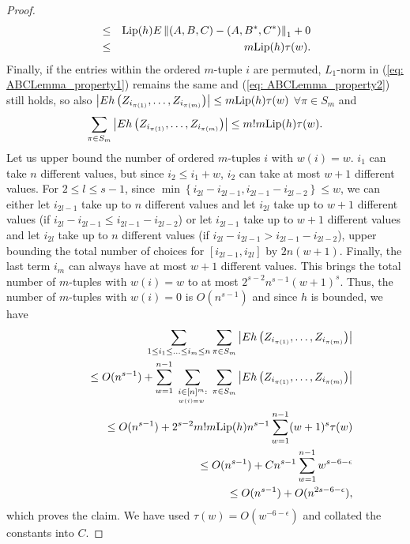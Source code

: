 \begin{proof}
\begin{eqnarray*}
 & \leq & \text{Lip}(h)E \left\Vert \left(A,B,C\right)-\left(A,B^{*},C^{*}\right)\right\Vert _{1}+0\\
 & \leq & m\text{Lip}(h)\tau(w).
\end{eqnarray*}
Finally, if the entries within the ordered $m$-tuple $i$ are permuted,
$L_{1}$-norm in (\ref{eq: ABCLemma_property1}) remains the same
and (\ref{eq: ABCLemma_property2}) still holds, so also $\left|E h\left(Z_{i_{\pi(1)}},\ldots,Z_{i_{\pi(m)}}\right)\right|\leq m\text{Lip}(h)\tau(w)$
$\forall\pi\in S_{m}$ and 
\[
\sum_{\pi\in S_{m}}\left|E h\left(Z_{i_{\pi(1)}},\ldots,Z_{i_{\pi(m)}}\right)\right|\leq m!m\text{Lip}(h)\tau(w).
\]
Let us upper bound the number of ordered $m$-tuples $i$ with $w(i)=w$.
$i_{1}$ can take $n$ different values, but since $i_{2}\leq i_{1}+w$,
$i_{2}$ can take at most $w+1$ different values. For $2\leq l\leq s-1$,
since $\min\left\{ i_{2l}-i_{2l-1},i_{2l-1}-i_{2l-2}\right\} \leq w$,
we can either let $i_{2l-1}$ take up to $n$ different values and
let $i_{2l}$ take up to $w+1$ different values (if $i_{2l}-i_{2l-1}\leq i_{2l-1}-i_{2l-2}$)
or let $i_{2l-1}$ take up to $w+1$ different values and let $i_{2l}$
take up to $n$ different values (if $i_{2l}-i_{2l-1}>i_{2l-1}-i_{2l-2}$),
upper bounding the total number of choices for $\left[i_{2l-1},i_{2l}\right]$
by $2n(w+1)$. Finally, the last term $i_{m}$ can always have at
most $w+1$ different values. This brings the total number of $m$-tuples
with $w(i)=w$ to at most $2^{\ensuremath{s-2}}n^{s-1}(w+1)^{s}$.
Thus, the number of $m$-tuples with $w(i)=0$ is $O(n^{s-1})$ and
since $h$ is bounded, we have
\begin{eqnarray*}
 &  & \sum_{1\leq i_{1}\leq\ldots\leq i_{m}\leq n}\sum_{\pi\in S_{m}}\left|E h\left(Z_{i_{\pi(1)}},\ldots,Z_{i_{\pi(m)}}\right)\right|\\
 &  & \qquad\leq O(n^{s-1})+\sum_{w=1}^{n-1}\;\sum_{\underset{w(i)=w}{i\in[n]^{m}}:}\;\sum_{\pi\in S_{m}}\left|E h\left(Z_{i_{\pi(1)}},\ldots,Z_{i_{\pi(m)}}\right)\right|\\
 &  & \qquad\quad\leq O(n^{s-1})+2^{s-2}m!m\text{Lip}(h)n^{s-1}\sum_{w=1}^{n-1}(w+1)^{s}\tau(w)\\
 &  & \qquad\quad\quad\leq O(n^{s-1})+Cn^{s-1}\sum_{w=1}^{n-1}w^{s-6-\epsilon}\\
 &  & \qquad\quad\quad\quad\leq O(n^{s-1})+O(n^{2s-6-\epsilon}),
\end{eqnarray*}
which proves the claim. We have used $\tau(w)=O(w^{-6-\epsilon})$
and collated the constants into $C$. 
\end{proof}

